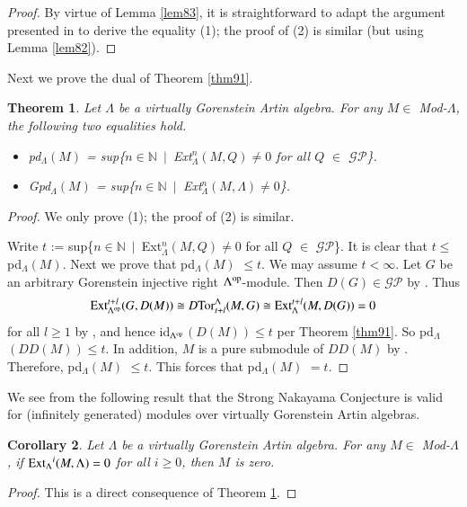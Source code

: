\documentclass[11pt,a4paper]{article}
\newtheorem{thm}{Theorem}[section]
\newtheorem{cor}[thm]{Corollary}
\begin{document}
\begin{proof} By virtue of Lemma \ref{lem83}, it is straightforward to adapt the argument presented in  \cite[Lemma 5.1]{bel1} to derive the equality  (1); the proof of (2) is similar
(but using Lemma \ref{lem82}).
\end{proof}

Next we prove the dual of Theorem \ref{thm91}.
 \begin{thm}\label{thm92}   Let    $\Lambda$ be a virtually
Gorenstein Artin algebra.  For any   $M\in $  {\rm Mod}-$\Lambda$, the following  two equalities hold.
 \begin{itemize}
\item[$(1)$]  {\rm  pd$_{\Lambda}$$(M)$ =  sup\{$n \in \mathbb{N}$\ $|$\   Ext$_{\Lambda}^{n}(M, Q) \neq  0$ for all $Q $   $\in $  $\mathscr{GP}$\}.}
\item[$(2)$] {\rm  Gpd$_{\Lambda}$$(M)$ =  sup\{$n \in \mathbb{N}$\ $|$\   Ext$_{\Lambda}^{n}(M, \Lambda) \neq  0$\}.}
\end{itemize}    \end{thm}



\begin{proof} We only prove  (1);  the proof of (2) is similar.

Write  $t$ := sup\{$n \in \mathbb{N}$\ $|$\   Ext$_{\Lambda}^{n}(M, Q) \neq  0$ for all $Q $   $\in $  $\mathscr{GP}$\}.
It is   clear that $t \leq$   pd$_{\Lambda}$$(M)$. Next we prove that    pd$_{\Lambda}$$(M)$ $\leq t $. We may
assume $t < \infty$. Let  $G $ be   an arbitrary Gorenstein injective right $\Lambda^{{\rm op}}$-module.
Then $D(G)  \in \mathscr {GP}$  by \cite[Lemma 8.6(1)]{bel}. Thus
$${\rm Ext}_{\Lambda^{{\rm op}}}^{t+l}(G, D(M)) \cong  D{\rm Tor}_{t+l}^{\Lambda}(M, G)  \cong      {\rm Ext}_{\Lambda}^{t+l}(M, D(G)) =  0$$ for all $l \geq 1 $
by  \cite[ Lemma 2.16(b)]{gbe}, and hence     id$_{\Lambda^{{\rm op}}}$$(D(M)) \leq t$   per Theorem \ref{thm91}. So  pd$_{\Lambda}$$(DD(M)) \leq t$.
In addition, $M  $ is a pure submodule of $DD(M)$ by \cite[Proposition 5.3.9]{eno5}. Therefore,  pd$_{\Lambda}$$(M)$ $\leq t $. This forces that  pd$_{\Lambda}$$(M)$ $= t $.
 \end{proof}

We see from the following result that the Strong Nakayama Conjecture is valid for (infinitely generated) modules over virtually Gorenstein Artin algebras.
\begin{cor}\label{cor10}   Let    $\Lambda$ be a virtually
Gorenstein Artin algebra.  For any   $M\in $  {\rm Mod}-$\Lambda$, if   ${\rm Ext_{\Lambda}}^{i}(M, \Lambda)=0$ for all  $i \geq 0$, then $M$ is zero.    \end{cor}
\begin{proof} This  is a direct consequence of Theorem \ref{thm92}.\end{proof}
\end{document}
